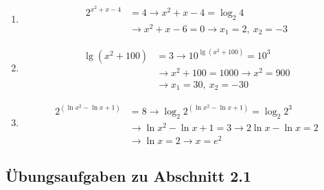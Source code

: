 \begin{enumerate}[label=\alph*)]
  \item \begin{align*}
      2^{x^2+x-4} &= 4 \rightarrow x^2 + x - 4 = \log_2 4\\
      &\rightarrow x^2 + x - 6 = 0 \rightarrow x_1 = 2,\ x_2 = -3
    \end{align*}
  \item \begin{align*}
      \lg(x^2 + 100) &= 3 \rightarrow 10^{\lg(x^2+100)} = 10^3\\
      &\rightarrow x^2 + 100 = 1000 \rightarrow x^2 = 900\\
      &\rightarrow x_1 = 30,\ x_2 = -30
    \end{align*}
  \item \begin{align*}
      2^{(\ln x^2 - \ln x + 1)} &= 8 \rightarrow \log_2 2^{(\ln x^2 - \ln x + 1)} = \log_2 2^3\\
      &\rightarrow \ln x^2 - \ln x + 1 = 3 \rightarrow 2\ln x - \ln x = 2\\
      &\rightarrow \ln x = 2 \rightarrow x = e^2
    \end{align*}\beispielende
\end{enumerate}

\subsection{Übungsaufgaben zu Abschnitt 2.1}

